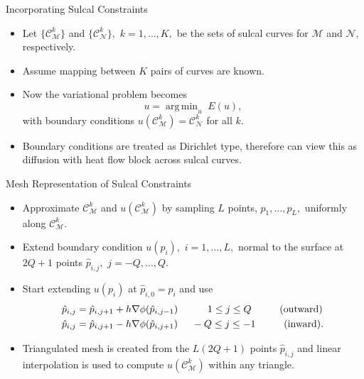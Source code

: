 \documentclass{beamer}
\DeclareMathOperator*{\argmin}{arg\,min}
\begin{document}
\begin{frame}{Incorporating Sulcal Constraints}
  \begin{itemize}
\item Let $\{\mathcal{C}_{\mathcal{M}}^k\}$ and $\{ \mathcal{C}_{\mathcal{N}}^k \},$ $k=1,\ldots , K,$ be the sets of sulcal curves for $\mathcal{M}$ and $\mathcal{N},$ respectively.
\item Assume mapping between $K$ pairs of curves are known.
\item Now the variational problem becomes $$u=\argmin_u\; E(u),$$ with boundary conditions $u(\mathcal{C}_{\mathcal{M}}^k)=\mathcal{C}_{\mathcal{N}}^k$  for all $k.$ 
\item Boundary conditions are treated as Dirichlet type, therefore can view this as diffusion with heat flow block across sulcal curves.
  \end{itemize}
\end{frame}

\begin{frame}{Mesh Representation of Sulcal Constraints}
  \begin{itemize}
\item Approximate $\mathcal{C}_{\mathcal{M}}^k$ and $u(\mathcal{C}_{\mathcal{M}}^k)$ by sampling $L$ points, $p_1,\ldots,p_L,$ uniformly along $\mathcal{C}_{\mathcal{M}}^k.$
\item Extend boundary condition $u(p_i),$ $i=1,\ldots, L,$ normal to the surface at $2Q+1$ points $\hat{p}_{i,j},$ $j=-Q, \ldots, Q.$
\item Start extending $u(p_i)$ at $\hat{p}_{i,0}=p_i$ and use 
\begin{align*}
\hat{p}_{i,j} &=\hat{p}_{i,j+1} + h \nabla \phi(\hat{p}_{i,j-1})\hspace{1.05cm} 1\leq j\leq Q \hspace{1cm} \text{(outward)}\\
\hat{p}_{i,j} &=\hat{p}_{i,j+1} - h \nabla \phi(\hat{p}_{i,j+1})\hspace{0.5cm} -Q\leq j\leq -1 \hspace{1cm} \text{(inward)}.
\end{align*}
\item Triangulated mesh is created from the $L(2Q+1)$ points $\hat{p}_{i,j}$ and linear interpolation is used to compute $u(\mathcal{C}_{\mathcal{M}}^k)$ within any triangle.
  \end{itemize}
\end{frame}
\end{document}
